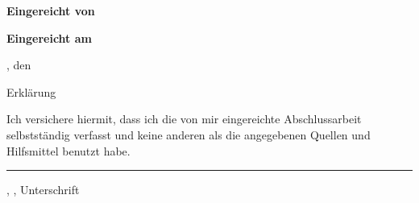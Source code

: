 \vspace*{4.3mm}
\textbf{Eingereicht von}\tab
\begin{minipage}[t]{\textwidth-4cm}
\EingereichtVon
\end{minipage}

\vspace*{-1mm}
\textbf{Eingereicht am}\tab 
\begin{minipage}[t]{\textwidth-4cm}
\Ort{}, den \Datum\strut
\end{minipage}

\newpage

\vspace*{-15.8mm}
\fontsize{19pt}{21pt}\selectfont
\ErklaerungUeberschrift

\vspace{25.3mm}
Erklärung

\normalsize\selectfont
\vspace{13.2mm}
Ich versichere hiermit, dass ich die von mir eingereichte Abschlussarbeit selbstständig verfasst und keine anderen als die angegebenen Quellen und Hilfsmittel benutzt habe.

\vspace{18.1mm}
\rule[-3.7mm]{\linewidth}{0.5pt}
\Ort{}, \Datum{}, Unterschrift



